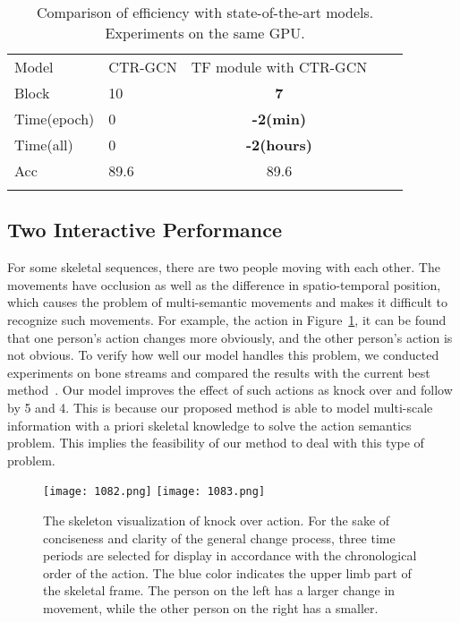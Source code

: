\documentclass[letterpaper]{article} \usepackage[submission]{aaai23}  \usepackage{times}  \usepackage{helvet}  \usepackage{courier}  \usepackage[hyphens]{url}  \usepackage{graphicx} \urlstyle{rm} \def\UrlFont{\rm}  \usepackage{natbib}  \usepackage{caption} \frenchspacing  \setlength{\pdfpagewidth}{8.5in} \setlength{\pdfpageheight}{11in} \usepackage{algorithm}
\begin{document}
\begin{table}[htp]
 \centering
\begin{tabular}{llccc}
\hline\noalign{\smallskip}
Model & CTR-GCN &TF module with CTR-GCN\\
\noalign{\smallskip}\hline\noalign{\smallskip}
Block&10&{\bf7}\\
Time(epoch)& 0&{\bf -2(min)}\\
Time(all)& 0&{\bf -2(hours)}\\
Acc&89.6&89.6\\



\noalign{\smallskip}\hline
\end{tabular}\caption{Comparison of efficiency with state-of-the-art models. Experiments on the same GPU.}
\label{tab:111}
\end{table}



\subsection{Two Interactive Performance}
For some skeletal sequences, there are two people moving with each other. The movements have occlusion as well as the difference in spatio-temporal position, which causes the problem of multi-semantic movements and makes it difficult to recognize such movements. For example, the action in Figure~\ref{1121}, it can be found that one person's action changes more obviously, and the other person's action is not obvious. To verify how well our model handles this problem, we conducted experiments on bone streams and compared the results with the current best method~\cite{2021Channel}. Our model improves the effect of such actions as knock over and follow by 5 and 4. This is because our proposed method is able to model multi-scale information with a priori skeletal knowledge to solve the action semantics problem. This implies the feasibility of our method to deal with this type of problem.
\begin{figure}[t]
{
\label{Fig.sub.2}
\texttt{[image: 1082.png]}}
{
\label{Fig.sub.3}
\texttt{[image: 1083.png]}}
\caption{The skeleton visualization of knock over action. For the sake of conciseness and clarity of the general change process, three time periods are selected for display in accordance with the chronological order of the action. The blue color indicates the upper limb part of the skeletal frame. The person on the left has a larger change in movement, while the other person on the right has a smaller.}
\label{1121}
\end{figure}
\end{document}
